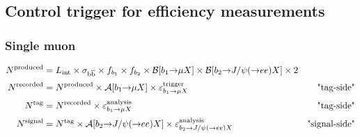 \clearpage
\subsection{Control trigger for efficiency measurements}

\subsubsection{Single muon}

\begin{align}
  N^{\text{produced}} & = L_{\text{int}} \times \sigma_{\text{b}\overline{\text{b}}} \times
  f_{b_{1}} \times f_{b_{2}} \times \mathcal{B}[b_1{\to}{\mu}X] \times
  \mathcal{B}[b_2{\to}{J}{/}{\psi}({\to}ee)X] \times 2 &
  \label{equ:mu-produced}
  \\[0.5ex]
  N^{\text{recorded}} & = N^{\text{produced}} \times
  {\ensuremath{\mathcal{A}}}[b_1{\to}{\mu}X] \times \varepsilon^{\text{trigger}}_{b_1{\to}{\mu}X} &
  \text{"tag-side"}
  \label{equ:mu-recorded}
  \\[0.5ex]
  N^{\text{tag}} & = N^{\text{recorded}} \times
  \varepsilon^{\text{analysis}}_{b_1{\to}{\mu}X} & \text{"tag-side"}
  \label{equ:mu-tag}
  \\[0.5ex]
  N^{\text{signal}} & = N^{\text{tag}} \times
  {\ensuremath{\mathcal{A}}}[b_2{\to}{J}{/}{\psi}({\to}ee)X] \times
  \varepsilon^{\text{analysis}}_{b_2{\to}{J}{/}{\psi}({\to}ee)X} &
  \text{"signal-side"}
  \label{equ:mu-signal}
\end{align}

